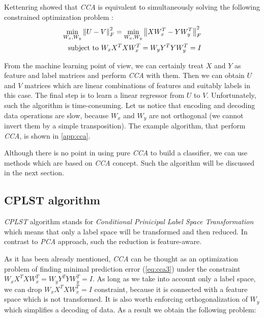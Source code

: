 Kettenring showed that \textit{CCA} is equivalent to simultaneously solving the following constrained optimization problem \cite{ChenLin}:
\begin{equation}\label{eq:cca3}
\begin{split}
    \min_{W_x, W_y} \left\lVert U-V\right\rVert_{F}^2 = \min_{W_x, W_y} \left\lVert XW_x^T-YW_y^T\right\rVert_{F}^2 \\ 
    \text{   subject to   } W_xX^TXW_x^T=W_yY^TYW_y^T=I   
\end{split}
\end{equation}

From the machine learning point of view, we can certainly treat $X$ and $Y$ as feature and label matrices and perform \textit{CCA} with them. Then we can obtain $U$ and $V$ matrices which are linear combinations of features and suitably labels in this case. The final step is to learn a linear regressor from $U$ to $V$. Unfortunately, such the algorithm is time-consuming. Let us notice that encoding and decoding data operations are slow, because $W_x$ and $W_y$ are not orthogonal (we cannot invert them by a simple transposition). The example algorithm, that perform \textit{CCA}, is shown in \cref{app:cca}. 

Although there is no point in using pure \textit{CCA} to build a classifier, we can use methods which are based on \textit{CCA} concept. Such the algorithm will be discussed in the next section.

\subsection{CPLST algorithm}

\textit{CPLST} algorithm stands for \textit{Conditional Prinicipal Label Space Transformation} which means that only a label space will be transformed and then reduced. In contrast to \textit{PCA} approach, such the reduction is feature-aware. 

As it has been already mentioned, \textit{CCA} can be thought as an optimization problem of finding minimal prediction error (\cref{eq:cca3}) under the constraint $W_xX^TXW_x^T=W_yY^TYW_y^T=I$. As long as we take into account only a label space, we can drop $W_xX^TXW_x^T=I$ constraint, because it is connected with a feature space which is not transformed. It is also worth enforcing orthogonalization of $W_y$  which simplifies a decoding of data. As a result we obtain the following problem:

